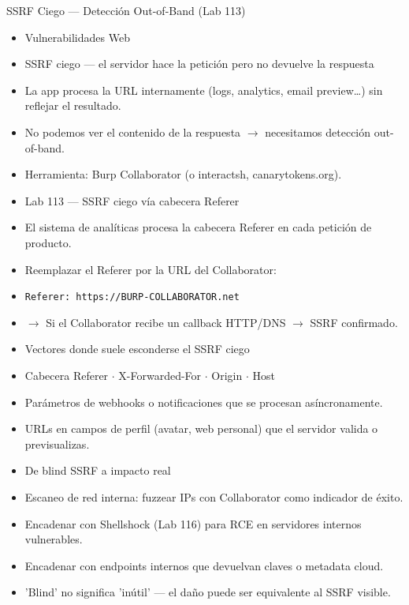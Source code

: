\documentclass[aspectratio=169,10pt]{beamer}
\newcommand{\cmd}[1]{\texttt{\color{uznavy}#1}}
\begin{document}
\begin{frame}[allowframebreaks]{SSRF Ciego --- Detección Out-of-Band (Lab 113)}
\small
  \begin{itemize}
  \item Vulnerabilidades Web
  \item SSRF ciego --- el servidor hace la petición pero no devuelve la respuesta
  \item La app procesa la URL internamente (logs, analytics, email preview\dots{}) sin reflejar el resultado.
  \item No podemos ver el contenido de la respuesta $\rightarrow$ necesitamos detección out-of-band.
  \item Herramienta: Burp Collaborator (o interactsh, canarytokens.org).
  \item Lab 113 --- SSRF ciego vía cabecera Referer
  \item El sistema de analíticas procesa la cabecera Referer en cada petición de producto.
  \item Reemplazar el Referer por la URL del Collaborator:
  \item \cmd{Referer: https://BURP-COLLABORATOR.net}
  \item $\rightarrow$ Si el Collaborator recibe un callback HTTP/DNS $\rightarrow$ SSRF confirmado.
  \item Vectores donde suele esconderse el SSRF ciego
  \item Cabecera Referer $\cdot$ X-Forwarded-For $\cdot$ Origin $\cdot$ Host
  \item Parámetros de webhooks o notificaciones que se procesan asíncronamente.
  \item URLs en campos de perfil (avatar, web personal) que el servidor valida o previsualizas.
  \item De blind SSRF a impacto real
  \item Escaneo de red interna: fuzzear IPs con Collaborator como indicador de éxito.
  \item Encadenar con Shellshock (Lab 116) para RCE en servidores internos vulnerables.
  \item Encadenar con endpoints internos que devuelvan claves o metadata cloud.
  \item 'Blind' no significa 'inútil' --- el daño puede ser equivalente al SSRF visible.
  \end{itemize}
\end{frame}
\end{document}
